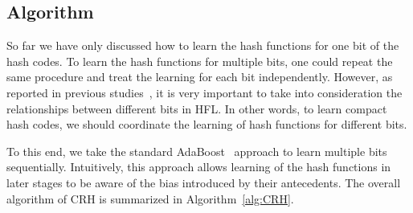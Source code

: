 


\subsection{Algorithm}

So far we have only discussed how to learn the hash functions for one bit of the hash codes.  To learn the hash functions for multiple bits, one could repeat the same procedure and treat the learning for each bit independently.  However, as reported in previous studies~\cite{wang2010cvpr,liu2011icml}, it is very important to take into consideration the relationships between different bits in \mbox{HFL}. In other words, to learn compact hash codes, we should coordinate the learning of hash functions for different bits.

To this end, we take the standard \mbox{AdaBoost}~\cite{freund1997adaboost} approach to learn multiple bits sequentially.
Intuitively, this approach allows learning of the hash functions in later stages to be aware of the bias introduced by their antecedents.  The overall algorithm of \mbox{CRH} is summarized in Algorithm~\ref{alg:CRH}. %

